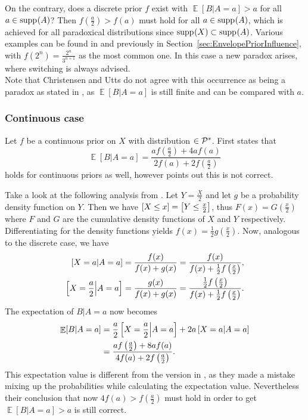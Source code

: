 \documentclass[a4paper]{report}
\theoremstyle{plain}
\theoremstyle{definition}
\theoremstyle{remark}
\numberwithin{equation}{chapter}
\let\P\relax
\DeclareMathOperator{\P}{\mathbb{P}}
\DeclareMathOperator{\E}{\mathbb{E}}
\DeclareMathOperator{\1}{\mathbbm{1}}
\DeclareMathOperator{\supp}{supp}
\newcommand{\Pmod}{\mathcal{P}^*}
\begin{document}
On the contrary, does a discrete prior $f$ exist with $\E[B|A=a]>a$ for all $a\in\supp_{\P}(A)$? Then $f\left(\frac{a}{2}\right)>f(a)$ must hold for all $a\in\supp_{\P}(A)$, which is achieved for all paradoxical distributions since $\supp_{\P}(X)\subset\supp_{\P}(A)$. Various examples can be found in \cite{Christensen93a,Linzer94,Broome95} and previously in Section~\ref{sec:EnvelopePriorInfluence}, with $f(2^n)=\frac{2^n}{3^{n+1}}$ as the most common one. In this case a new paradox arises, where switching is always advised.\\
Note that Christensen and Utts do not agree with this occurrence as being a paradox as stated in \cite{Christensen93a}, as $\E[B|A=a]$ is still finite and can be compared with $a$.

\subsubsection{Continuous case}
Let $f$ be a continuous prior on $X$ with distribution $\P\in\Pmod$. First \cite{Christensen92} states that
\begin{equation}
\E[B|A=a]=\frac{af\left(\frac{a}{2}\right)+4af(a)}{2f(a)+2f\left(\frac{a}{2}\right)}
\end{equation}
holds for continuous priors as well, however \cite{Christensen96} points out this is not correct.

Take a look at the following analysis from \cite{Brams95}. Let $Y=\frac{X}{2}$ and let $g$ be a probability density function on $Y$. Then we have $\P[X\leq x]=\P\left[Y\leq \frac{x}{2}\right]$, thus $F(x)=G\left(\frac{x}{2}\right)$ where $F$ and $G$ are the cumulative density functions of $X$ and $Y$ respectively. Differentiating for the density functions yields $f(x)=\frac{1}{2}g\left(\frac{x}{2}\right)$. Now, analogous to the discrete case, we have
\begin{align}
\P[X=a|A=a]&=\frac{f(x)}{f(x)+g(x)}=\frac{f(x)}{f(x)+\frac{1}{2}f\left(\frac{x}{2}\right)},\\
\P\left[X=\frac{a}{2}\middle|A=a\right]&=\frac{g(x)}{f(x)+g(x)}=\frac{\frac{1}{2}f\left(\frac{x}{2}\right)}{f(x)+\frac{1}{2}f\left(\frac{x}{2}\right)}.
\end{align}
The expectation of $B|A=a$ now becomes
\begin{align}
\E[B|A=a]&=\frac{a}{2}\P\left[X=\frac{a}{2}\middle|A=a\right]+2a\P\left[X=a\middle|A=a\right]\\
&=\frac{af\left(\frac{a}{2}\right)+8af(a)}{4f(a)+2f\left(\frac{a}{2}\right)}.
\end{align}
This expectation value is different from the version in \cite{Christensen96}, as they made a mistake mixing up the probabilities while calculating the expectation value. Nevertheless their conclusion that now $4f(a)>f\left(\frac{a}{2}\right)$ must hold in order to get $\E[B|A=a]>a$ is still correct.
\end{document}
